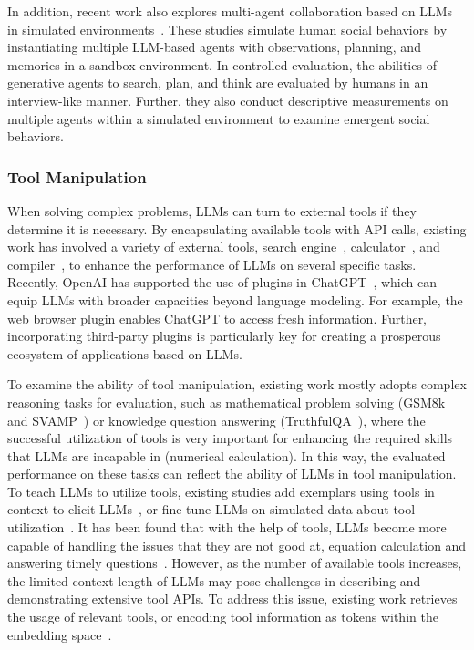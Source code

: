 {
In addition, recent work also explores multi-agent collaboration based on LLMs in simulated environments~\cite{Park-arxiv-2023-Generative,Fu-arxiv-2023-Improving,Metha-arxiv-2023-Improving}.
These studies simulate human social behaviors by instantiating multiple LLM-based agents with observations, planning, and memories in a sandbox environment.
In controlled evaluation, the abilities of generative agents to search, plan, and think  are evaluated by humans in an interview-like manner.
Further, they also conduct descriptive measurements on multiple agents within a simulated environment to examine emergent social behaviors.
}



\subsubsection{Tool Manipulation}

When solving complex problems, LLMs can turn to external tools if they determine it is necessary. %
By encapsulating available tools with API calls, existing work has involved a variety of  external tools, \eg search engine~\cite{Nakano-arxiv-2021-WebGPT}, calculator~\cite{Schick-arxiv-2023-Toolformer}, and compiler~\cite{Gao-arxiv-2022-PAL}, to enhance the performance of LLMs on several  specific tasks. Recently, OpenAI has supported the use of  plugins in ChatGPT~\cite{OpenAI-blog-2023-plugins}, which can equip LLMs with broader capacities beyond language modeling. For example, the web browser plugin enables ChatGPT to access fresh information. Further, incorporating third-party plugins is particularly key for creating a prosperous ecosystem of applications based on LLMs. 

{To examine the ability of tool manipulation, existing work mostly adopts complex reasoning tasks for evaluation, such as mathematical problem solving (\eg GSM8k~\cite{Cobbe-arxiv-2021-Training} and  SVAMP~\cite{Patel-NAACL-2021-Are}) or knowledge question answering (\eg TruthfulQA~\cite{Lin-ACL-2022-TruthfulQA}), where the successful utilization of tools is very important for enhancing the required skills that LLMs are  incapable in (\eg numerical calculation).
In this way, the evaluated performance on these tasks can reflect the ability of LLMs in tool manipulation.}
To teach LLMs to utilize tools, existing studies add exemplars using tools in context to elicit LLMs~\cite{Gao-arxiv-2022-PAL}, or fine-tune LLMs on simulated data about tool utilization~\cite{Parisi-arxiv-2022-TALM, Schick-arxiv-2023-Toolformer}.
It has been found that with the help of tools, LLMs become  more capable of handling the issues that they are not good at,  \eg equation calculation and answering timely questions~\cite{Schick-arxiv-2023-Toolformer,Chen-2023-arXiv-chatcot}.
{
However, as the number of available tools increases, the limited context length of LLMs may pose challenges in describing and demonstrating extensive tool APIs.
To address this issue, existing work retrieves the usage of relevant tools, or encoding tool information as tokens within the embedding space~\cite{Shishir-2023-arxiv-Gorilla,Hao-2023-arxiv-ToolkenGPT,Liang-2023-arxiv-TaskMatrix}.}

